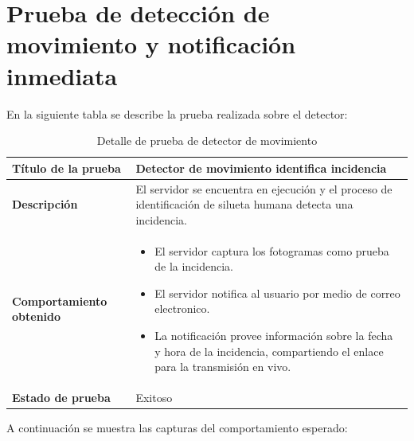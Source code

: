 \section{Prueba de detección de movimiento y notificación inmediata}

En la siguiente tabla se describe la prueba realizada sobre el detector:\\

\begin{table}[H]
    \caption{Detalle de prueba de detector de movimiento}
    \begin{center}
        \begin{tabular}{|>{\centering}p{}|m{}<{\centering}|} 
            \hline
            \textbf{Título de la prueba} & Detector de movimiento identifica incidencia \\
            \hline
            \textbf{Descripción} & El servidor se encuentra en ejecución y el proceso de identificación de silueta humana detecta una incidencia.\\
            \hline
            \textbf{Comportamiento obtenido} & 
            \begin{itemize}
                \item El servidor captura los fotogramas como prueba de la incidencia.
                \item El servidor notifica al usuario por medio de correo electronico.
                \item La notificación provee información sobre la fecha y hora de la incidencia, compartiendo el enlace para la transmisión en vivo.
            \end{itemize} \\ 
            \hline
            \textbf{Estado de prueba} & Exitoso \\
            \hline
        \end{tabular}
    \end{center}
\end{table}

A continuación se muestra las capturas del comportamiento esperado:

